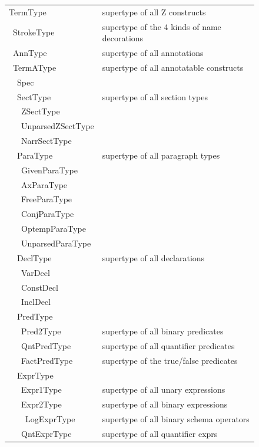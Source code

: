 \documentclass{llncs}  %
\begin{document}
\newcommand{\I}{\hbox{\ \qquad}}
\begin{figure}[htb]
\begin{scriptsize}
\begin{tabular}{ll}
TermType                  &supertype of all Z constructs \\
\I StrokeType             &supertype of the 4 kinds of name decorations\\
\I AnnType                &supertype of all annotations\\
\I TermAType              &supertype of all annotatable constructs\\
\I\I  Spec                &\\
\I\I  SectType            &supertype of all section types \\
\I\I\I  ZSectType         &\\
\I\I\I  UnparsedZSectType &\\
\I\I\I  NarrSectType      &\\
\I\I  ParaType            &supertype of all paragraph types\\
\I\I\I  GivenParaType\\
\I\I\I  AxParaType\\
\I\I\I  FreeParaType\\
\I\I\I  ConjParaType\\
\I\I\I  OptempParaType\\
\I\I\I  UnparsedParaType\\
\I\I  DeclType            &supertype of all declarations\\
\I\I\I  VarDecl\\
\I\I\I  ConstDecl\\
\I\I\I  InclDecl\\
\I\I  PredType\\
\I\I\I  Pred2Type         &supertype of all binary predicates\\
\I\I\I  QntPredType       &supertype of all quantifier predicates\\
\I\I\I  FactPredType      &supertype of the true/false predicates\\
\I\I  ExprType\\
\I\I\I  Expr1Type         &supertype of all unary expressions\\
\I\I\I  Expr2Type         &supertype of all binary expressions\\
\I\I\I\I  LogExprType     &supertype of all binary schema operators\\
\I\I\I  QntExprType       &supertype of all quantifier exprs\\

\end{tabular}
\end{scriptsize}
\end{figure}
\end{document}
